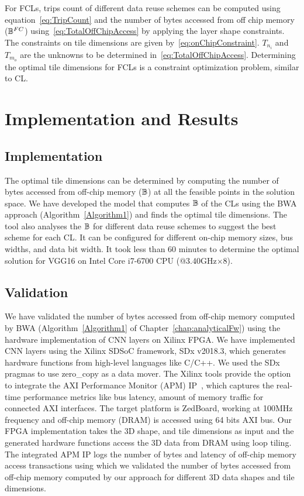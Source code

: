 For FCLs, trips count of different data reuse schemes can be computed using equation~\ref{eq:TripCount} and the number of bytes accessed from off chip memory ($\mathbb{B}^{FC}$) using~\eqref{eq:TotalOffChipAccess} by applying the layer shape constraints. The constraints on tile dimensions are given by~\eqref{eq:onChipConstraint}. $T_{n_i}$ and $T_{m_o}$ are the unknowns to be determined in~\eqref{eq:TotalOffChipAccess}. Determining the optimal tile dimensions for FCLs is a constraint optimization problem, similar to CL.
\section{Implementation and Results}
\subsection{Implementation}
The optimal tile dimensions can be determined by computing the number of bytes accessed from off-chip memory ($\mathbb{B}$) at all the feasible points in the solution space. 
We have developed the model that computes $\mathbb{B}$ of the CLs using the BWA approach (Algorithm~\ref{Algorithm1}) and finds the optimal tile dimensions. The tool also analyses the $\mathbb{B}$ for different data reuse schemes to suggest the best scheme for each CL. It can be configured for different on-chip memory sizes, bus widths, and data bit width. It took less than 60 minutes to determine the optimal solution for VGG16 on Intel Core i7-6700 CPU (@3.40GHz$\times$8).
\subsection{Validation}\label{Validation}
We have validated the number of bytes accessed from off-chip memory computed by BWA (Algorithm~\ref{Algorithm1} of Chapter~\ref{chap:analyticalFw}) using the hardware implementation of CNN layers on Xilinx FPGA. We have implemented CNN layers using the Xilinx SDSoC framework, SDx v2018.3, which generates hardware functions from high-level languages like C/C++. We used the SDx pragmas to use zero\_copy as a data mover. The Xilinx tools provide the option to integrate the AXI Performance Monitor (APM) IP~\cite{APM}, which captures the real-time performance metrics like bus latency, amount of memory traffic for connected AXI interfaces. The target platform is ZedBoard, working at 100MHz frequency and off-chip memory (DRAM) is accessed using 64 bits AXI bus. 
Our FPGA implementation takes the 3D shape, and tile dimensions as input and the generated hardware functions access the 3D data from DRAM using loop tiling. The integrated APM IP logs the number of bytes and latency of off-chip memory access transactions using which we validated the number of bytes accessed from off-chip memory computed by our approach for different 3D data shapes and tile dimensions.
